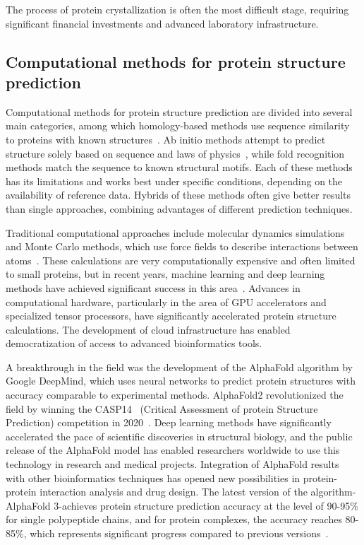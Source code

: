 The process of protein crystallization is often the most difficult stage, requiring significant financial investments and advanced laboratory infrastructure.

\subsection{Computational methods for protein structure prediction}
Computational methods for protein structure prediction are divided into several main categories, among which homology-based methods use sequence similarity to proteins with known structures~\cite{baek2023overview}.
Ab initio methods attempt to predict structure solely based on sequence and laws of physics~\cite{ab_initio_protein_folding}, while fold recognition methods match the sequence to known structural motifs.
Each of these methods has its limitations and works best under specific conditions, depending on the availability of reference data.
Hybrids of these methods often give better results than single approaches, combining advantages of different prediction techniques.

Traditional computational approaches include molecular dynamics simulations and Monte Carlo methods, which use force fields to describe interactions between atoms~\cite{zhang2008itasser}.
These calculations are very computationally expensive and often limited to small proteins, but in recent years, machine learning and deep learning methods have achieved significant success in this area~\cite{senior2020deep}.
Advances in computational hardware, particularly in the area of GPU accelerators and specialized tensor processors, have significantly accelerated protein structure calculations.
The development of cloud infrastructure has enabled democratization of access to advanced bioinformatics tools.

A breakthrough in the field was the development of the AlphaFold algorithm by Google DeepMind, which uses neural networks to predict protein structures with accuracy comparable to experimental methods.
AlphaFold2 revolutionized the field by winning the CASP14~\cite{casp} (Critical Assessment of protein Structure Prediction) competition in 2020~\cite{alphafold2, tunyasuvunakool2021casp14}.
Deep learning methods have significantly accelerated the pace of scientific discoveries in structural biology, and the public release of the AlphaFold model has enabled researchers worldwide to use this technology in research and medical projects.
Integration of AlphaFold results with other bioinformatics techniques has opened new possibilities in protein-protein interaction analysis and drug design.
The latest version of the algorithm-AlphaFold 3-achieves protein structure prediction accuracy at the level of 90-95\% for single polypeptide chains, and for protein complexes, the accuracy reaches 80-85\%, which represents significant progress compared to previous versions~\cite{alphafold3}.


